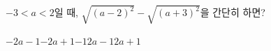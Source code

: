 $-3<a<2$일 때, $\sqrt{(a-2)^2}-\sqrt{(a+3)^2}$을 간단히 하면?
\begin{choices32}{$-2a-1$}{$-2a+1$}{$-1$}{$2a-1$}{$2a+1$}\end{choices32}
